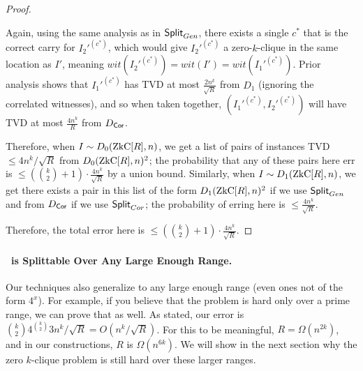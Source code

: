 \begin{proof}
\begin{itemize}
		Again, using the same analysis as in $\mathsf{Split}_{Gen}$, there exists a single $c^*$ that is the correct carry for $I_2'^{(c^*)}$, which would give $I_2'^{(c^*)}$ a zero-$k$-clique in the same location as $I'$, meaning $wit(I_2'^{(c^*)}) = wit(I') = wit(I_1'^{(c^*)})$. Prior analysis shows that $I_1'^{(c^*)}$ has TVD at most $\frac{2n^k}{\sqrt R}$ from $D_1$ (ignoring the correlated witnesses), and so when taken together, $(I_1'^{(c^*)}, I_2'^{(c^*)})$ will have TVD at most $\frac{4n^k}{R}$ from $D_{\mathsf{Cor}}$.
	\end{itemize}
	
	Therefore, when $I \sim D_0(\ZkC[R], n)$, we get a list of pairs of instances TVD $\le 4n^k / \sqrt R$ from $D_0(\ZkC[R], n)^2$; the probability that any of these pairs here err is $\le(\binom k 2 + 1) \cdot \frac{4n^k}{\sqrt R}$ by a union bound. Similarly, when $I \sim D_1(\ZkC[R], n)$, we get there exists a pair in this list of the form $D_1(\ZkC[R], n)^2$ if we use $\mathsf{Split}_{Gen}$ and from $D_{\mathsf{Cor}}$ if we use $\mathsf{Split}_{Cor}$; the probability of erring here is $\le \frac{4 n^k }{\sqrt R}.$
	
	Therefore, the total error here is $\le (\binom k 2 + 1) \cdot \frac{4n^k}{\sqrt R}$.
	
	
\end{proof}

\paragraph{\zkclique~is Splittable Over Any Large Enough Range.}
Our techniques also generalize to any large enough range (even ones not of the form $4^x$). For example, if you believe that the problem is hard only over a prime range, we can prove that as well. As stated, our error is $\binom{k}{2}4^{\binom{k}{2}}3 n^k/\sqrt{R} = O(n^k/\sqrt R)$. For this to be meaningful, $R = \Omega(n^{2k})$, and in our constructions, $R$ is $\Omega(n^{6k})$. We will show in the next section why the zero $k$-clique problem is still hard over these larger ranges.

